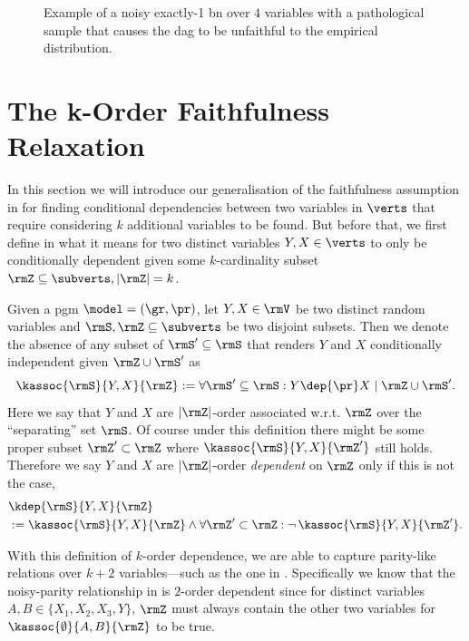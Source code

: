 \documentclass[accepted]{uai2026} %
\theoremstyle{plain}
\theoremstyle{definition}
\theoremstyle{remark}
\begin{document}
\begin{figure}
  \centering
  
  \caption{Example of a noisy exactly-1 \gls{bn} over $4$ variables with
  a pathological sample that causes the \gls{dag} to be unfaithful to
  the empirical distribution.}
  \label{fig:sample}
\end{figure}

\section{The k-Order Faithfulness Relaxation}\label{sec:relax}
In this section we will introduce our generalisation of the faithfulness
assumption in  for finding conditional dependencies
between two variables in $\verts$ that require considering $k$
additional variables to be found. But before that, we first define in
 what it means for two distinct variables $Y,X\in\verts$
to only be conditionally dependent given some $k$-cardinality subset
$\rmZ\subseteq\subverts, |\rmZ| = k$.


\begin{definition}\label{def:k-dep}
  Given a \gls{pgm} $\model=(\gr, \pr)$, let $Y,X\in\rmV$ be two
  distinct random variables and $\rmS,\rmZ\subseteq\subverts$ be two
  disjoint subsets. Then we denote the absence of any subset of
  $\rmS'\subseteq\rmS$ that renders $Y$ and $X$
  conditionally independent given $\rmZ \cup \rmS'$ as
  \begin{equation}
    \label{eq:k-dep-asc}
    \kassoc{\rmS}{Y,X}{\rmZ}
    := \forall \rmS' \subseteq \rmS :
    Y \dep{\pr} X \mid \rmZ \cup \rmS'.
  \end{equation}
  Here we say that $Y$ and $X$ are $|\rmZ|$-order associated
  w.r.t. $\rmZ$ over the ``separating'' set $\rmS$.
  Of course under this definition there might be some proper subset
  $\rmZ' \subset \rmZ$ where $\kassoc{\rmS}{Y,X}{\rmZ'}$ still
  holds. Therefore we say $Y$ and $X$ are $|\rmZ|$-order
  \emph{dependent} on $\rmZ$ only if this is not the case,
  \begin{gather}
    \begin{aligned}
      &\kdep{\rmS}{Y,X}{\rmZ}\\
      &:= \kassoc{\rmS}{Y,X}{\rmZ} \wedge
        \forall \rmZ' \subset \rmZ : \neg\,\kassoc{\rmS}{Y,X}{\rmZ'}.
    \end{aligned}
    \label{eq:k-dep-dep}
  \end{gather}
\end{definition}
With this definition of $k$-order dependence, we are
able to capture parity-like relations over $k+2$ variables---such as the
one in . Specifically we know that the noisy-parity
relationship in  is $2$-order dependent since for
distinct variables $A,B\in\{X_{1},X_{2},X_{3},Y\}$, $\rmZ$ must always
contain the other two variables for $\kassoc{\emptyset}{A,B}{\rmZ}$ to
be true.
\end{document}
